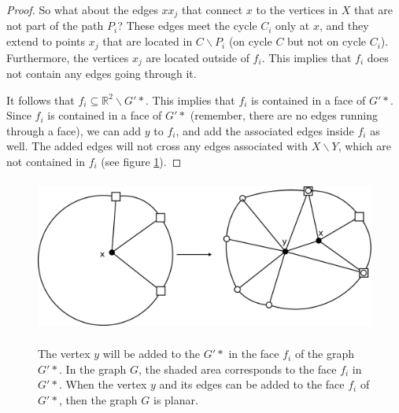 \begin{proof}
So what about the edges $xx_j$ that connect $x$ to the vertices in $X$ that are not part of the path $P_i$? These edges meet the cycle $C_i$ only at $x$, and they extend to points $x_j$ that are located in $C\backslash P_i$ (on cycle $C$ but not on cycle $C_i$). Furthermore, the vertices $x_j$ are located outside of $f_i$. This implies that $f_i$ does not contain any edges going through it.

It follows that $f_i \subseteq \mathbb{R}^2 \backslash G'*$. This implies that $f_i$ is contained in a face of $G'*$. Since $f_i$ is contained in a face of $G'*$ (remember, there are no edges running through a face), we can add $y$ to $f_i$, and add the associated edges inside $f_i$ as well. The added edges will not cross any edges associated with $X \backslash Y$, which are not contained in $f_i$ (see figure \ref{faceAdd}).
\end{proof}
\begin{figure}[htbp]
	\centering
	\includegraphics[height=2in]{faceAdd.eps} \\ 
	\caption{The vertex $y$ will be added to the $G'*$ in the face $f_i$ of the graph $G'*$. In the graph $G$, the shaded area corresponds to the face $f_i$ in $G'*$. When the vertex $y$ and its edges can be added to the face $f_i$ of $G'*$, then the graph $G$ is planar.}
\label{faceAdd}
\end{figure}


